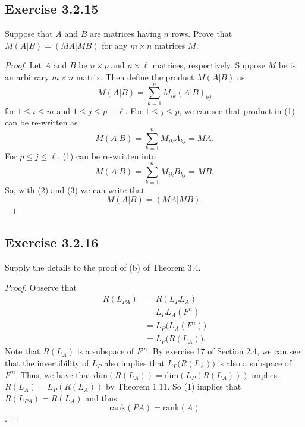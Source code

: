 \subsection*{Exercise 3.2.15} Suppose that \( A   \) and \( B  \) are matrices having \( n  \) rows. Prove that \( M(A|B) = (MA|MB) \) for any \( m \times n  \) matrices \( M  \).
\begin{proof}
Let \( A  \) and \( B  \) be \( n \times p  \) and \( n \times \ell  \) matrices, respectively. Suppose \( M  \) be is an arbitrary \( m \times n  \) matrix. Then define the product \( M (A | B ) \) as 
\[  M (A|B) = \sum_{ k =1  }^{ n  } {M}_{ik } (A | B)_{kj} \tag{1} \]
for \( 1 \leq i \leq m  \) and \( 1 \leq j \leq  p + \ell  \). For \( 1 \leq j \leq p  \), we can see that product in (1) can be re-written as
\[  M (A|B) = \sum_{ k= 1  }^{ n } {M}_{ik } {A}_{kj} = MA. \tag{2} \]
For \( p \leq j \leq \ell  \), (1) can be re-written into
\[  M (A|B) = \sum_{ k=1  }^{ n } {M}_{ik } {B}_{kj} = MB. \tag{3} \]
So, with (2) and (3) we can write that
\[  M (A|B) = (MA | MB). \]
\end{proof}

\subsection*{Exercise 3.2.16} Supply the details to the proof of (b) of Theorem 3.4.
\begin{proof}
Observe that
\begin{align*}
   R({L}_{PA}) &= R({L}_{P} {L}_{A}) \\
               &=  {L}_{P} {L}_{A}(F^{n}) \\
               &= {L}_{P} \Big( {L}_{A} (F^{n}) \Big) \\
               &= {L}_{P} \Big(  R( {L}_{A}) \Big). \tag{1}
\end{align*}
Note that \( R({L}_{A})  \) is a subspace of \( F^{m} \). By exercise 17 of Section 2.4, we can see that the invertibility of \( {L}_{P} \) also implies that \( {L}_{P}\Big(R({L}_{A})\Big) \) is also a subspace of \( F^{m} \). Thus, we have that \( \text{dim}(R({L}_{A})) = \text{dim}({L}_{P}({R}({L}_{A}))) \) implies \( R({L}_{A}) = {L}_{P}(R({L}_{A})) \) by Theorem 1.11. So (1) implies that \( R({L}_{PA}) = R({L}_{A})   \) and thus \[ \text{rank}(PA) = \text{rank}(A) \].
\end{proof}
